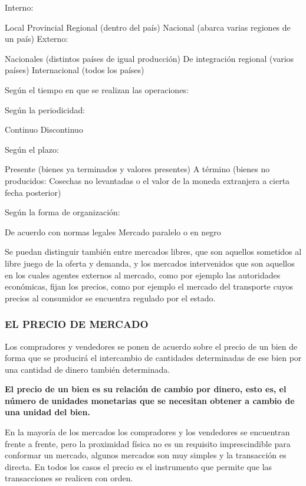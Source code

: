 Interno:

Local Provincial Regional (dentro del país) Nacional (abarca varias regiones de un país) Externo:

Nacionales (distintos países de igual producción) De integración regional (varios países) Internacional (todos los países)

Según el tiempo en que se realizan las operaciones:

Según la periodicidad:

Continuo Discontinuo

Según el plazo:

Presente (bienes ya terminados y valores presentes) A término (bienes no producidos: Cosechas no levantadas o el valor de la moneda extranjera a cierta fecha posterior)

Según la forma de organización:

De acuerdo con normas legales Mercado paralelo o en negro



Se puedan distinguir también entre mercados libres, que son aquellos sometidos al libre juego de la oferta y demanda, y los mercados intervenidos que son aquellos en los cuales agentes externos al mercado, como por ejemplo las autoridades económicas, fijan los precios, como por ejemplo el mercado del transporte cuyos precios al consumidor se encuentra regulado por el estado.

\subsubsection*{EL PRECIO DE MERCADO}
Los compradores y vendedores se ponen de acuerdo sobre el precio de un bien de forma que se producirá el intercambio de cantidades determinadas de ese bien por una cantidad de dinero también determinada.


\begin{recuadro}
\textbf{El precio de un bien es su relación de cambio por dinero, esto es, el número de} \textbf{unidades monetarias que se necesitan obtener a cambio de una unidad del bien.}
\end{recuadro}

En la mayoría de los mercados los compradores y los vendedores se encuentran frente a frente, pero la proximidad física no es un requisito imprescindible para conformar un mercado, algunos mercados son muy simples y la transacción es directa. En todos los casos el precio es el instrumento que permite que las transacciones se realicen con orden.

